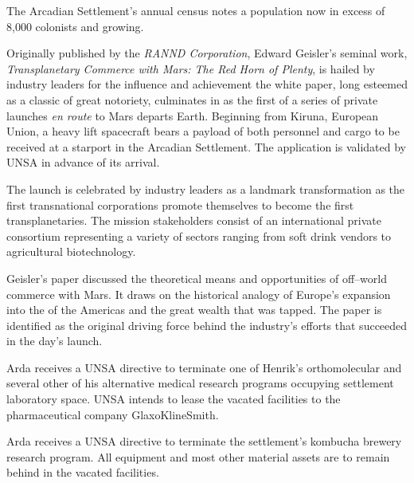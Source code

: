 

The Arcadian Settlement's annual census notes a population now in excess of 8,000 colonists and growing.
\StopTimelineDate

Originally published by the {\it RANND Corporation}, Edward Geisler's seminal work, {\it Transplanetary Commerce with Mars: The Red Horn of Plenty}, is hailed by industry leaders for the influence and achievement the white paper, long esteemed as a classic of great notoriety, culminates in as the first of a series of private launches {\it en route} to Mars departs Earth. Beginning from Kiruna, European Union, a heavy lift spacecraft bears a payload of both personnel and cargo to be received at a starport in the Arcadian Settlement. The application is validated by UNSA in advance of its arrival.

The launch is celebrated by industry leaders as a landmark transformation as the first transnational corporations promote themselves to become the first transplanetaries. The mission stakeholders consist of an international private consortium representing a variety of sectors ranging from soft drink vendors to agricultural biotechnology.

Geisler's paper discussed the theoretical means and opportunities of off--world commerce with Mars. It draws on the historical analogy of Europe's expansion into the  of the Americas and the great wealth that was tapped. The paper is identified as the original driving force behind the industry's efforts that succeeded in the day's launch.
\StopTimelineDate

Arda receives a UNSA directive to terminate one of Henrik's orthomolecular and several other of his alternative medical research programs occupying settlement laboratory space. UNSA intends to lease the vacated facilities to the pharmaceutical company GlaxoKlineSmith.
\StopTimelineDate

Arda receives a UNSA directive to terminate the settlement's kombucha brewery research program. All equipment and most other material assets are to remain behind in the vacated facilities. 

